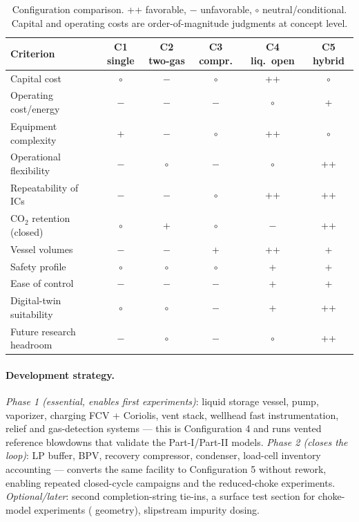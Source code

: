 \begin{table}[htb]
\centering
\small
\caption{Configuration comparison. ++ favorable, $-$ unfavorable,
$\circ$ neutral/conditional. Capital and operating costs are
order-of-magnitude judgments at concept level.}
\label{tab:matrix}
\begin{tabular}{lccccc}
\toprule
Criterion & C1 single & C2 two-gas & C3 compr. & C4 liq.\ open &
C5 hybrid \\
\midrule
Capital cost & $\circ$ & $-$ & $\circ$ & ++ & $\circ$ \\
Operating cost/energy & $-$ & $-$ & $-$ & $\circ$ & + \\
Equipment complexity & + & $-$ & $\circ$ & ++ & $\circ$ \\
Operational flexibility & $-$ & $\circ$ & $-$ & $\circ$ & ++ \\
Repeatability of ICs & $-$ & $-$ & $\circ$ & ++ & ++ \\
CO$_2$ retention (closed) & $\circ$ & + & $\circ$ & $-$ & ++ \\
Vessel volumes & $-$ & $-$ & + & ++ & + \\
Safety profile & $\circ$ & $\circ$ & $\circ$ & + & + \\
Ease of control & $-$ & $-$ & $-$ & + & + \\
Digital-twin suitability & $\circ$ & $\circ$ & $-$ & + & ++ \\
Future research headroom & $-$ & $\circ$ & $-$ & $\circ$ & ++ \\
\bottomrule
\end{tabular}
\end{table}

\paragraph{Development strategy.} \emph{Phase 1 (essential, enables
first experiments)}: liquid storage vessel, pump, vaporizer, charging
FCV + Coriolis, vent stack, wellhead fast instrumentation, relief and
gas-detection systems --- this is Configuration 4 and runs vented
reference blowdowns that validate the Part-I/Part-II models.
\emph{Phase 2 (closes the loop)}: LP buffer, BPV, recovery
compressor, condenser, load-cell inventory accounting --- converts
the same facility to Configuration 5 without rework, enabling
repeated closed-cycle campaigns and the reduced-choke experiments.
\emph{Optional/later}: second completion-string tie-ins, a
surface test section for choke-model experiments
(\citealp{hammer2022} geometry), slipstream impurity dosing.

